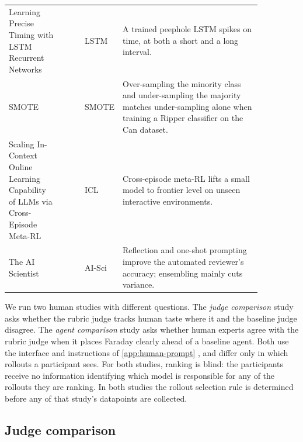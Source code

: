 \documentclass[garamond,a4paper]{inherent}
\renewcommand{\sectionautorefname}{Section}%
\renewcommand{\subsectionautorefname}{Section}%
\renewcommand{\subsubsectionautorefname}{Section}%
\DeclareRobustCommand{\appref}[1]{%
  \begingroup
  \renewcommand{\sectionautorefname}{Appendix}%
  \renewcommand{\subsectionautorefname}{Appendix}%
  \renewcommand{\subsubsectionautorefname}{Appendix}%
  \autoref{#1}%
  \endgroup}
\newcommand{\faradayname}{Faraday\xspace}
\begin{document}
\begin{table}[b!]
\begin{tabular}{@{}>{\raggedright\arraybackslash}p{0.215\linewidth} >{\raggedright\arraybackslash}c >{\raggedright\arraybackslash}p{0.085\linewidth} >{\raggedright\arraybackslash}p{0.555\linewidth}@{}}
        Learning Precise Timing with LSTM Recurrent Networks \newline\cite{gers2002learning} & 8 & LSTM & A trained peephole LSTM spikes on time, at both a short and a long interval. \\
        \addlinespace[2pt]
        SMOTE \newline\cite{chawla2002smote} & 23 & SMOTE & Over-sampling the minority class and under-sampling the majority matches under-sampling alone when training a Ripper classifier on the Can dataset. \\
        \addlinespace[2pt]
        Scaling In-Context Online Learning Capability of LLMs via Cross-Episode Meta-RL \newline\cite{lin2026orbit} & 1 & ICL & Cross-episode meta-RL lifts a small model to frontier level on unseen interactive environments. \\
        \addlinespace[2pt]
        The AI Scientist \newline\cite{sakanaaiscientist} & 2 & AI-Sci & Reflection and one-shot prompting improve the automated reviewer's accuracy; ensembling mainly cuts variance. \\
        \bottomrule
    
\end{tabular}
\end{table}

We run two human studies with different questions.
The \emph{judge comparison} study asks whether the rubric judge tracks human taste where it and the baseline judge disagree.
The \emph{agent comparison} study asks whether human experts agree with the rubric judge when it places \faradayname clearly ahead of a baseline agent.
Both use the interface and instructions of \appref{app:human-prompt}, and differ only in which rollouts a participant sees. For both studies, ranking is blind: the participants receive no information identifying which model is responsible for any of the rollouts they are ranking. 
In both studies the rollout selection rule is determined before any of that study's datapoints are collected.

\subsection{Judge comparison}
\label{app:judge-comparison}
\end{document}
